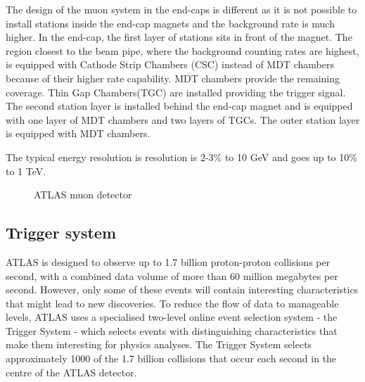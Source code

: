 \documentclass[a4paper, oneside, 11pt, openright]{book}
\begin{document}
					The design of the muon system in the end-caps is different as it is not possible to install stations inside the end-cap magnets and the background rate is much higher. In the end-cap, the first layer of stations sits in front of the magnet. The region closest to the beam pipe, where the background counting rates are highest, is equipped with Cathode Strip Chambers (CSC) instead of MDT chambers because of their higher rate capability. MDT chambers provide the remaining coverage. Thin Gap Chambers(TGC) are installed providing the trigger signal. The second station layer is installed behind the end-cap magnet and is equipped with one layer of MDT chambers and two layers of TGCs. The outer station layer is equipped with MDT chambers.
					
					The typical energy resolution is resolution is 2-3\% to 10 GeV and goes up to 10\% to 1 TeV.
					\begin{figure} [H]
						\centering
						 \quad
						\caption{ATLAS muon detector}
						\label{fig:ATLAS muon detector}
					\end{figure}
				
				\subsection{Trigger system}
					\cite{Trigger intro}ATLAS is designed to observe up to 1.7 billion proton-proton collisions per second, with a combined data volume of more than 60 million megabytes per second. However, only some of these events will contain interesting characteristics that might lead to new discoveries. To reduce the flow of data to manageable levels, ATLAS uses a specialised two-level online event selection system - the Trigger System - which selects events with distinguishing characteristics that make them interesting for physics analyses. The Trigger System selects approximately 1000 of the 1.7 billion collisions that occur each second in the centre of the ATLAS detector. 
				
\end{document}
